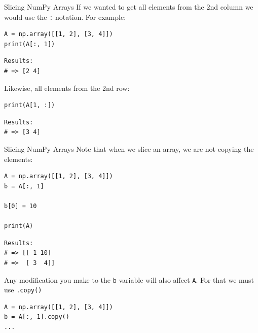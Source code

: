 \documentclass[10pt]{beamer}
\begin{document}
\begin{frame}[label={sec:org26a35e3},fragile]{Slicing NumPy Arrays}
 If we wanted to get all elements from the 2nd column we would use the \texttt{:} notation. For
example:

\begin{verbatim}
A = np.array([[1, 2], [3, 4]])
print(A[:, 1])
\end{verbatim}

\begin{verbatim}
Results: 
# => [2 4]
\end{verbatim}


Likewise, all elements from the 2nd row:

\begin{verbatim}
print(A[1, :])
\end{verbatim}

\begin{verbatim}
Results: 
# => [3 4]
\end{verbatim}
\end{frame}

\begin{frame}[label={sec:org81015f0},fragile]{Slicing NumPy Arrays}
 Note that when we slice an array, we are \alert{not copying} the elements:

\begin{verbatim}
A = np.array([[1, 2], [3, 4]])
b = A[:, 1]

b[0] = 10

print(A)
\end{verbatim}

\begin{verbatim}
Results: 
# => [[ 1 10]
# =>  [ 3  4]]
\end{verbatim}


Any modification you make to the \texttt{b} variable will also affect \texttt{A}. For that we must use
\texttt{.copy()}

\begin{verbatim}
A = np.array([[1, 2], [3, 4]])
b = A[:, 1].copy()
...
\end{verbatim}
\end{frame}
\end{document}
